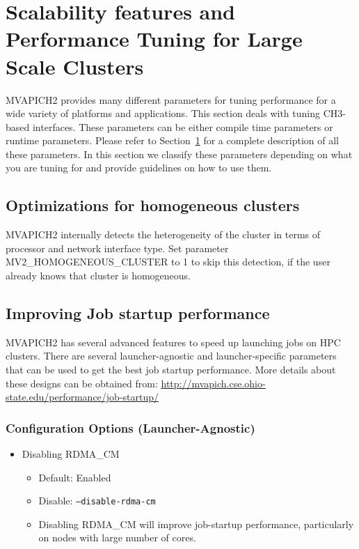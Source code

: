 \section{Scalability features and Performance Tuning for Large Scale Clusters}
\label{sec:performance-tuning}

MVAPICH2 provides many different parameters for tuning performance for a
wide variety of platforms and applications. This section deals with
tuning CH3-based interfaces. These parameters can be either compile time
parameters or runtime parameters. Please refer to
Section~\ref{sec:performance-tuning} for a complete description of all
these parameters.  In this section we classify these parameters
depending on what you are tuning for and provide guidelines on how to
use them.

\subsection{Optimizations for homogeneous clusters}

MVAPICH2 internally detects the heterogeneity of the cluster in terms of 
processor and network interface type. Set parameter MV2\_HOMOGENEOUS\_CLUSTER to 1 
to skip this detection, if the user already knows that cluster is homogeneous.

\subsection{Improving Job startup performance}

MVAPICH2 has several advanced features to speed up launching jobs on
HPC clusters. There are several launcher-agnostic and launcher-specific
parameters that can be used to get the best job startup performance. More
details about these designs can be obtained from:
\url{http://mvapich.cse.ohio-state.edu/performance/job-startup/} 

\subsubsection{Configuration Options (Launcher-Agnostic)}

\begin{itemize}
\item Disabling RDMA\_CM
    \begin{itemize}
        \item Default: Enabled
        \item Disable: \texttt{--disable-rdma-cm}
        \item Disabling RDMA\_CM will improve job-startup performance,
            particularly on nodes with large number of cores.
    \end{itemize}
\end{itemize}

